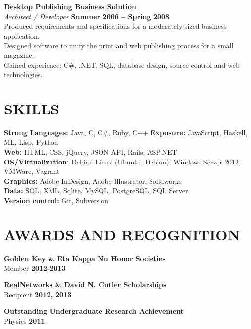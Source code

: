 \documentclass[margin,line]{resume}
\begin{document}
\begin{resume}
    \textbf{\listing Desktop Publishing Business Solution} \vspace{2mm}\\\vspace{1mm}%
    \textsl{Architect / Developer} \hfill \textbf{Summer 2006 -- Spring 2008}\\
    Produced requirements and specifications for a moderately sized business application.\\
    Designed software to unify the print and web publishing process for a small magazine.\\
    Gained experience: C\#, .NET, SQL, database design, source control and web technologies.
    

\sectionline

    \section{\mysidestyle \textbf{\large{S}\small{KILLS}}}

    \textbf{Strong Languages:} Java, C, C\#, Ruby, C++ \textbf{Exposure:} JavaScript, Haskell, ML, Lisp, Python\\
    \textbf{Web:} HTML, CSS, jQuery, JSON API, Rails, ASP.NET\\
    \textbf{OS/Virtualization:} Debian Linux (Ubuntu, Debian), Windows Server 2012, VMWare, Vagrant\\
    \textbf{Graphics:} Adobe InDesign, Adobe Illustrator, Solidworks\\
    \textbf{Data:} SQL, XML, Sqlite, MySQL, PostgreSQL, SQL Server\\
    \textbf{Version control:} Git, Subversion

\sectionline

    \section{\mysidestyle \textbf{\large{A}\small{WARDS AND RECOGNITION}}}

    \textbf{\listing Golden Key \& Eta Kappa Nu Honor Societies}\\
    Member \hfill \textbf{2012-2013}

    \textbf{\listing RealNetworks \& David N. Cutler Scholarships}\\
    Recipient \hfill \textbf{2012, 2013}

    \textbf{\listing Outstanding Undergraduate Research Achievement}\\
    Physics \hfill \textbf{2011}

\end{resume}
\end{document}
